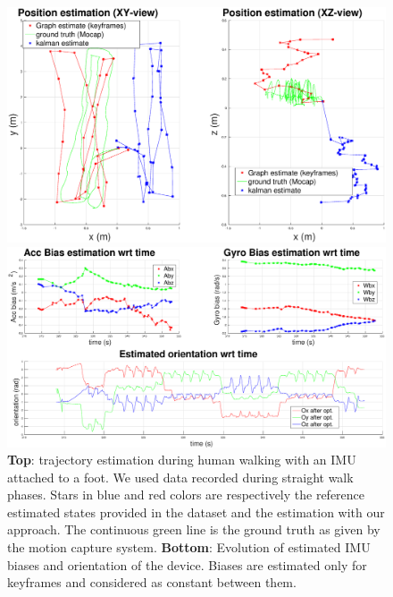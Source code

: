 \begin{figure}[tb]
\centering
\includegraphics[scale=0.175]{figures/experiments/straight_walk/XY_XZ_viewsRotated.eps}
\par\vspace{4mm}
\includegraphics[scale=0.175]{figures/experiments/straight_walk/bias_orientation.eps}
\caption{ 
{\bf Top}: trajectory estimation during human walking with an IMU attached to a foot. We used data recorded during straight walk phases. Stars in blue and red colors are respectively the reference estimated states provided in the dataset and the estimation with our approach.
The continuous green line is the ground truth as given by the motion capture system.
{\bf Bottom}: Evolution of estimated IMU biases and orientation of the device. Biases are estimated only for keyframes and considered as constant between them. 
}
\label{fig:straight_walk}
\end{figure}

